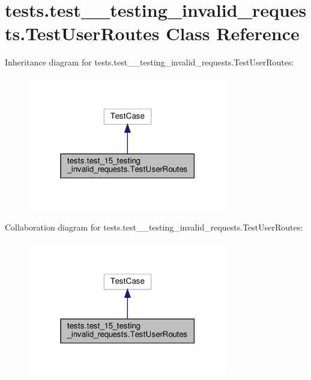 \hypertarget{classtests_1_1test__15__testing__invalid__requests_1_1_test_user_routes}{}\section{tests.\+test\+\_\+\_\+testing\+\_\+invalid\+\_\+requests.\+Test\+User\+Routes Class Reference}
\label{classtests_1_1test__15__testing__invalid__requests_1_1_test_user_routes}


Inheritance diagram for tests.\+test\+\_\+\_\+testing\+\_\+invalid\+\_\+requests.\+Test\+User\+Routes\+:\nopagebreak
\begin{figure}[H]
\begin{center}
\leavevmode
\includegraphics[width=247pt]{classtests_1_1test__15__testing__invalid__requests_1_1_test_user_routes__inherit__graph}
\end{center}
\end{figure}


Collaboration diagram for tests.\+test\+\_\+\_\+testing\+\_\+invalid\+\_\+requests.\+Test\+User\+Routes\+:\nopagebreak
\begin{figure}[H]
\begin{center}
\leavevmode
\includegraphics[width=247pt]{classtests_1_1test__15__testing__invalid__requests_1_1_test_user_routes__coll__graph}
\end{center}
\end{figure}
